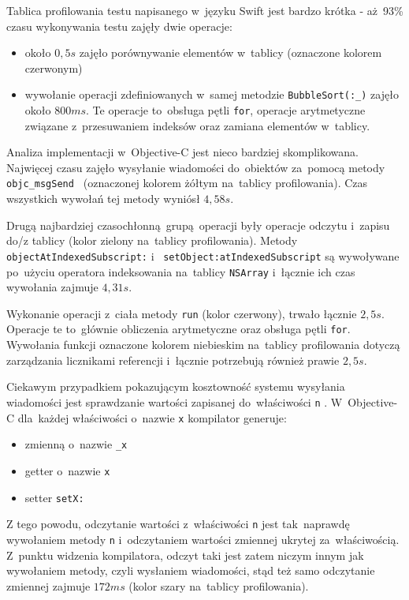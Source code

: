 \documentclass[mgr, shortabstract]{iithesis}
\newcommand{\swiftinline}[1]{
    \texttt{#1}
}
\newcommand{\objcinline}[1]{
    \texttt{#1}
}
\begin{document}
Tablica profilowania testu napisanego w~języku Swift jest bardzo krótka - aż~93\% czasu wykonywania testu zajęły dwie operacje:

\begin{itemize}
    \item około $0,5s$ zajęło porównywanie elementów w~tablicy (oznaczone kolorem czerwonym)
    \item wywołanie operacji zdefiniowanych w~samej metodzie \swiftinline{BubbleSort(:_)} zajęło około $800 ms$. Te operacje to~obsługa pętli \texttt{for}, operacje arytmetyczne związane z~przesuwaniem indeksów oraz zamiana elementów w~tablicy.
\end{itemize}

Analiza implementacji w~Objective-C jest nieco bardziej skomplikowana. Najwięcej czasu zajęło wysyłanie wiadomości do~obiektów za~pomocą metody \objcinline{objc_msgSend } (oznaczonej kolorem żółtym na~tablicy profilowania). Czas wszystkich wywołań tej metody wyniósł $4,58s$.

Drugą najbardziej czasochłonną grupą operacji były operacje odczytu i~zapisu do/z tablicy (kolor zielony na~tablicy profilowania). Metody \objcinline{objectAtIndexedSubscript:} i~\objcinline{setObject:atIndexedSubscript} są wywoływane po~użyciu operatora indeksowania na~tablicy \objcinline{NSArray} i~łącznie ich czas wywołania zajmuje $4,31s$.

Wykonanie operacji z~ciała metody \objcinline{run} (kolor czerwony), trwało łącznie $2,5s$. Operacje te to~głównie obliczenia arytmetyczne oraz obsługa pętli \texttt{for}. Wywołania funkcji oznaczone kolorem niebieskim na~tablicy profilowania dotyczą zarządzania licznikami referencji i~łącznie potrzebują  również prawie $2,5s$.

Ciekawym przypadkiem pokazującym kosztowność systemu wysyłania wiadomości jest sprawdzanie wartości zapisanej do~właściwości \objcinline{n}. W~Objective-C dla~każdej właściwości o~nazwie \objcinline{x} kompilator generuje:

\begin{itemize}
    \item zmienną o~nazwie \objcinline{_x}
    \item getter o~nazwie \objcinline{x}
    \item setter \objcinline{setX:}
\end{itemize}

Z tego powodu, odczytanie wartości z~właściwości  \objcinline{n} jest tak~naprawdę wywołaniem metody \objcinline{n} i~odczytaniem wartości zmiennej ukrytej za~właściwością. Z~punktu widzenia kompilatora, odczyt taki jest zatem niczym innym jak wywołaniem metody, czyli wysłaniem wiadomości, stąd też samo odczytanie zmiennej zajmuje $172ms$ (kolor szary na~tablicy profilowania).
\end{document}
